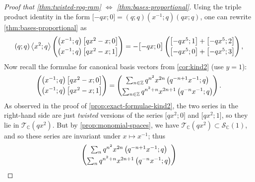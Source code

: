 \documentclass[reqno,11pt]{amsart}
\theoremstyle{definition}
\theoremstyle{remark}
\numberwithin{equation}{section}
\newcommand{\Z}{\mathbb{Z}}
\newcommand{\C}{\mathbb{C}}
\newcommand{\mT}{\mathcal{T}}
\newcommand{\mS}{\mathcal{S}}
\newcommand{\la}{\left\langle}
\newcommand{\ra}{\right\rangle}
\newcommand{\vect}[2]{\big[{#1};{#2}\big]}
\begin{document}
\begin{proof}[Proof that \cref{thm:twisted-rog-ram} $\Leftrightarrow$ \cref{thm:bases-proportional}]
Using the triple product identity in the form $\vect{-qx}{0} = (q;q) \left(x^{-1}; q\right) (qx; q)$,
one can rewrite \cref{thm:bases-proportional} as
\[
    (q; q)\la x^2; q \ra
    \begin{pmatrix}
    \left(x^{-1}; q\right)\vect{qx^2-x}{0} 
    \vspace{0.1cm} \\
    \left(x^{-1}; q\right)\vect{qx^2-x}{1}
    \end{pmatrix}
    = 
    -\vect{-qx}{0}
    \begin{pmatrix}
    \vect{-qx^5}{1} + \vect{-qx^5}{2} 
    \vspace{0.1cm} \\
    \vect{-qx^5}{0} + \vect{-qx^5}{3} 
    \end{pmatrix},
\]
Now recall the formulae for canonical basis vectors from \cref{cor:kind2} (use $y = 1$):
\[
    \begin{pmatrix}
    \left(x^{-1}; q\right)\vect{qx^2-x}{0} 
    \vspace{0.1cm} \\
    \left(x^{-1}; q\right)\vect{qx^2-x}{1}
    \end{pmatrix}
    =
    \begin{pmatrix}
    \sum_{n \in \Z}
    q^{n^2} x^{2n} \left(q^{-n+1}x^{-1}; q\right)
    \vspace{0.1cm} \\
    \sum_{n \in \Z}
    q^{n^2+n} x^{2n+1} \left(q^{-n}x^{-1}; q\right)
    \end{pmatrix}.
\]
As observed in the proof of \cref{prop:exact-formulae-kind2}, the two series in the right-hand side are just \emph{twisted} versions of the series $\vect{qx^2}{0}$ and $\vect{qx^2}{1}$, so they lie in $\mT_\C\left(qx^2\right)$. But by \cref{prop:monomial-spaces}, we have $\mT_\C\left(qx^2\right) \subset \mS_\C(1)$, and so these series are invariant under $x \mapsto x^{-1}$; thus 
\[
    \begin{pmatrix}
    \sum_{n}
    q^{n^2} x^{2n} \left(q^{-n+1}x^{-1}; q\right)
    \vspace{0.1cm} \\
    \sum_{n}
    q^{n^2+n} x^{2n+1} \left(q^{-n}x^{-1}; q\right)
    \end{pmatrix}
\]
\end{proof}
\end{document}
